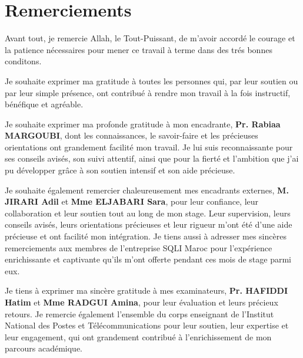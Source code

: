 \chapter*{Remerciements}



Avant tout, je remercie Allah, le Tout-Puissant, de m'avoir accordé le courage et la patience nécessaires pour mener ce travail à terme dans des trés bonnes conditons.

\vspace{10pt}
Je souhaite exprimer ma gratitude à toutes les personnes qui, par leur soutien ou par leur simple présence, ont contribué à rendre mon travail à la fois instructif, bénéfique et agréable.

\vspace{10pt}
Je souhaite exprimer ma profonde gratitude à mon encadrante, \textbf{Pr. Rabiaa MARGOUBI}, dont les connaissances, le savoir-faire et les précieuses orientations ont grandement facilité mon travail. Je lui suis reconnaissante pour ses conseils avisés, son suivi attentif, ainsi que pour la fierté et l'ambition que j'ai pu développer grâce à son soutien intensif et son aide précieuse.

\vspace{10pt}
Je souhaite également remercier chaleureusement mes encadrants externes, \textbf{M. JIRARI Adil} et \textbf{Mme ELJABARI Sara}, pour leur confiance, leur collaboration et leur soutien tout au long de mon stage. Leur supervision, leurs conseils avisés, leurs orientations précieuses et leur rigueur m'ont été d'une aide précieuse et ont facilité mon intégration. Je tiens aussi à adresser mes sincères remerciements aux membres de l'entreprise SQLI Maroc pour l'expérience enrichissante et captivante qu'ils m'ont offerte pendant ces mois de stage parmi eux.

\vspace{10pt}
Je tiens à exprimer ma sincère gratitude à mes examinateurs, \textbf{Pr. HAFIDDI Hatim} et \textbf{Mme RADGUI Amina}, pour leur évaluation et leurs précieux retours. Je remercie également l'ensemble du corps enseignant de l’Institut National des Postes et Télécommunications pour leur soutien, leur expertise et leur engagement, qui ont grandement contribué à l’enrichissement de mon parcours académique.
